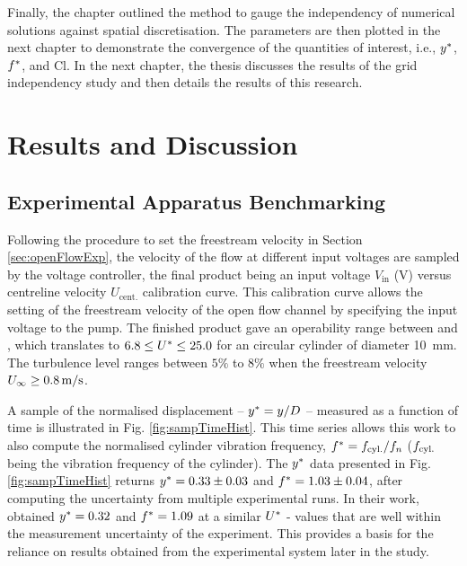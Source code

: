 \documentclass[oneside]{utmthesis}
\begin{document}
Finally, the chapter outlined the method to gauge the independency of numerical solutions against spatial discretisation. The parameters are then plotted in the next chapter to demonstrate the convergence of the quantities of interest, i.e., $y^{*}$, $f^{*}$, and Cl. In the next chapter, the thesis discusses the results of the grid independency study and then details the results of this research.

\chapter{Results and Discussion} \label{chap:resultsDisc}

\section{Experimental Apparatus Benchmarking} \label{sec:appBenchmark}

 Following the procedure to set the freestream velocity in Section \ref{sec:openFlowExp}, the velocity of the flow at different input voltages are sampled by the voltage controller, the final product being an input voltage $V_{\text{in}}$ (V) versus centreline velocity $U_{\text{cent.}}$ calibration curve. This calibration curve allows the setting of the freestream velocity of the open flow channel by specifying the input voltage to the pump. The finished product gave an operability range between \uth{} and \uel{}, which translates to $6.8 \leq U^{*} \leq 25.0$ for an circular cylinder of diameter \SI{10}{\milli\metre}. The turbulence level ranges between $5\%$ to $8\%$ when the freestream velocity $U_{\infty} \geq \uei$.

 A sample of the normalised displacement -- $y^{*} = y/D$ -- measured as a function of time is illustrated in Fig. \ref{fig:sampTimeHist}. This time series allows this work to also compute the normalised cylinder vibration frequency, $f^{*} = f_{\text{cyl.}}/f_{n}$ ($f_{\text{cyl.}}$ being the vibration frequency of the cylinder). The $y^{*}$ data presented in Fig. \ref{fig:sampTimeHist} returns $y^{*} = 0.33 \pm 0.03$ and $f^{*} = 1.03 \pm 0.04$, after computing the uncertainty from multiple experimental runs. In their work, \citet{Koide2013} obtained $y^{*} = 0.32$ and $f^{*} = 1.09$ at a similar $U^{*}$ - values that are well within the measurement uncertainty of the experiment. This provides a basis for the reliance on results obtained from the experimental system later in the study.
\end{document}
